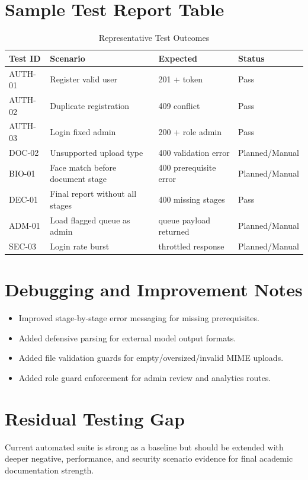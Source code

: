 \section{Sample Test Report Table}
\begin{longtable}{p{1.7cm}p{5.8cm}p{3.2cm}p{3.7cm}}
\caption{Representative Test Outcomes}\\
\toprule
Test ID & Scenario & Expected & Status \\
\midrule
AUTH-01 & Register valid user & 201 + token & Pass \\
AUTH-02 & Duplicate registration & 409 conflict & Pass \\
AUTH-03 & Login fixed admin & 200 + role admin & Pass \\
DOC-02 & Unsupported upload type & 400 validation error & Planned/Manual \\
BIO-01 & Face match before document stage & 400 prerequisite error & Planned/Manual \\
DEC-01 & Final report without all stages & 400 missing stages & Pass \\
ADM-01 & Load flagged queue as admin & queue payload returned & Planned/Manual \\
SEC-03 & Login rate burst & throttled response & Planned/Manual \\
\bottomrule
\end{longtable}

\section{Debugging and Improvement Notes}
\begin{itemize}
\item Improved stage-by-stage error messaging for missing prerequisites.
\item Added defensive parsing for external model output formats.
\item Added file validation guards for empty/oversized/invalid MIME uploads.
\item Added role guard enforcement for admin review and analytics routes.
\end{itemize}

\section{Residual Testing Gap}
Current automated suite is strong as a baseline but should be extended with deeper negative, performance, and security scenario evidence for final academic documentation strength.
